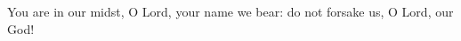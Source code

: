 \lettrine[loversize=0.15,lines=2]{Y}{}ou are in our midst, O Lord,
   your name we bear:
   do not forsake us, O Lord, our God!
